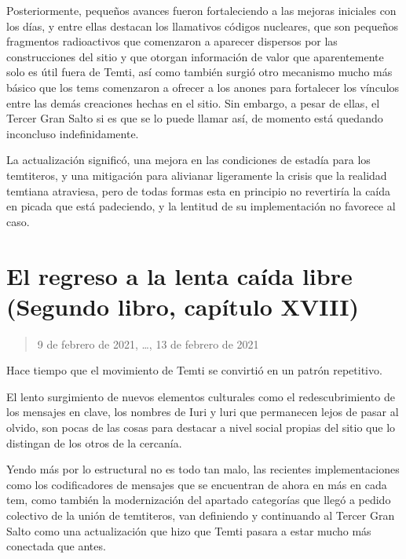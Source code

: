 \documentclass[
  spanish,
]{book}
\begin{document}
Posteriormente, pequeños avances fueron fortaleciendo a las mejoras iniciales con los días, y entre ellas destacan los llamativos códigos nucleares, que son pequeños fragmentos radioactivos que comenzaron a aparecer dispersos por las construcciones del sitio y que otorgan información de valor que aparentemente solo es útil fuera de Temti, así como también surgió otro mecanismo mucho más básico que los tems comenzaron a ofrecer a los anones para fortalecer los vínculos entre las demás creaciones hechas en el sitio. Sin embargo, a pesar de ellas, el Tercer Gran Salto si es que se lo puede llamar así, de momento está quedando inconcluso indefinidamente.

La actualización significó, una mejora en las condiciones de estadía para los temtiteros, y una mitigación para alivianar ligeramente la crisis que la realidad temtiana atraviesa, pero de todas formas esta en principio no revertiría la caída en picada que está padeciendo, y la lentitud de su implementación no favorece al caso.

\hypertarget{el-regreso-a-la-lenta-cauxedda-libre-segundo-libro-capuxedtulo-xviii}{%
\section{El regreso a la lenta caída libre (Segundo libro, capítulo XVIII)}\label{el-regreso-a-la-lenta-cauxedda-libre-segundo-libro-capuxedtulo-xviii}}

\begin{quote}
9 de febrero de 2021, \ldots, 13 de febrero de 2021
\end{quote}

Hace tiempo que el movimiento de Temti se convirtió en un patrón repetitivo.

El lento surgimiento de nuevos elementos culturales como el redescubrimiento de los mensajes en clave, los nombres de Iuri y luri que permanecen lejos de pasar al olvido, son pocas de las cosas para destacar a nivel social propias del sitio que lo distingan de los otros de la cercanía.

Yendo más por lo estructural no es todo tan malo, las recientes implementaciones como los codificadores de mensajes que se encuentran de ahora en más en cada tem, como también la modernización del apartado categorías que llegó a pedido colectivo de la unión de temtiteros, van definiendo y continuando al Tercer Gran Salto como una actualización que hizo que Temti pasara a estar mucho más conectada que antes.
\end{document}
